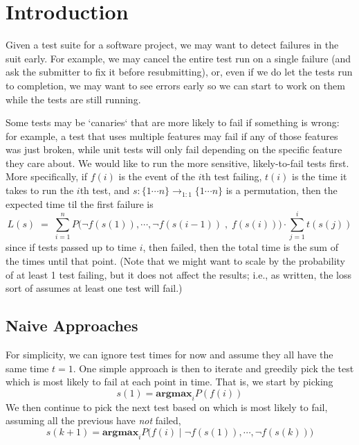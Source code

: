 \documentclass[12pt]{article}
\begin{document}
\maketitle


\section{Introduction}
Given a test suite for a software project, we may want to detect failures in the suit early. For example, we may cancel the entire test run on a single failure (and ask the submitter to fix it before resubmitting), or, even if we do let the tests run to completion, we may want to see errors early so we can start to work on them while the tests are still running.

Some tests may be `canaries` that are more likely to fail if something is wrong: for example, a test that uses multiple features may fail if any of those features was just broken, while unit tests will only fail depending on the specific feature they care about. We would like to run the more sensitive, likely-to-fail tests first. More specifically, if $f(i)$ is the event of the $i$th test failing, $t(i)$ is the time it takes to run the  $i$th test, and $s : \{ 1\cdots n \} \rightarrow_{1:1} \{ 1 \cdots n \}$ is a permutation, then the expected time til the first failure is
\[ L(s) \; = \; \sum_{i=1}^{n} P\Big(\neg f(s(1)),\cdots,\neg f(s(i-1)) \;,\;f(s(i)) \Big) \cdot \sum_{j=1}^i t(s(j))  \]
since if tests passed up to time $i$, then failed, then the total time is the sum of the times until that point. (Note that we might want to scale by the probability of at least 1 test failing, but it does not affect the results; i.e., as written, the loss sort of assumes at least one test will fail.)

\subsection{Naive Approaches}

For simplicity, we can ignore test times for now and assume they all have the same time $t = 1$. One simple approach is then to iterate and greedily pick the test which is most likely to fail at each point in time. That is, we start by picking
\[ s(1) = \textbf{argmax}_{i} P(f(i)) \]
We then continue to pick the next test based on which is most likely to fail, assuming all the previous have \emph{not} failed,
\[ s(k+1) = \textbf{argmax}_{i} P\Big(f(i) \; \Big| \; \neg f(s(1)), \cdots , \neg f(s(k)) \Big) \]
\end{document}
